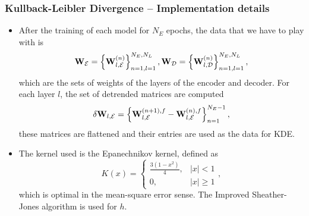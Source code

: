 \documentclass[11pt,aspectratio=169]{beamer}
\newcommand{\abs}[1]{\left|#1\right|}
\newcommand{\bracks}[1]{\left\{#1\right\}}
\begin{document}
    \begin{frame}
        \frametitle{Kullback-Leibler Divergence -- Implementation details}
        \begin{itemize}
            \item 
            After the training of each model for $N_E$ epochs, the 
            data that we have to play with is 
            \begin{equation}
                {\bf W}_\mathcal{E} = \bracks{{\bf W}_{l,\mathcal{E}}^{(n)}}_{n=1, l=1}^{N_E, N_L}, 
                {\bf W}_\mathcal{D} = \bracks{{\bf W}_{l,\mathcal{D}}^{(n)}}_{n=1, l=1}^{N_E, N_L}, 
            \end{equation}
            which are the sets of weights of the layers of the encoder and decoder. 
            For each layer $l$, the set of detrended matrices are computed
            \begin{equation}
                \delta{\bf W}_{l, \mathcal{E}} = \bracks{{\bf W}_{l,\mathcal{E}}^{(n+1),f} - {\bf W}_{l,\mathcal{E}}^{(n),f}}_{n=1}^{N_E-1},
            \end{equation}
            these matrices are flattened and their entries are used as the data for KDE.
            \item
            The kernel used is the Epanechnikov kernel, defined as 
            \begin{equation}
                K(x) = 
                \begin{cases}
                    \frac{3(1-x^2)}{4}, & \abs{x} < 1 \\
                    0, & \abs{x} \geq 1
                \end{cases},\label{eqn:epanechnikov}
            \end{equation}
            which is optimal in the mean-square error sense. The Improved Sheather-Jones algorithm is used for $h$.
        \end{itemize}
    \end{frame}
\end{document}
